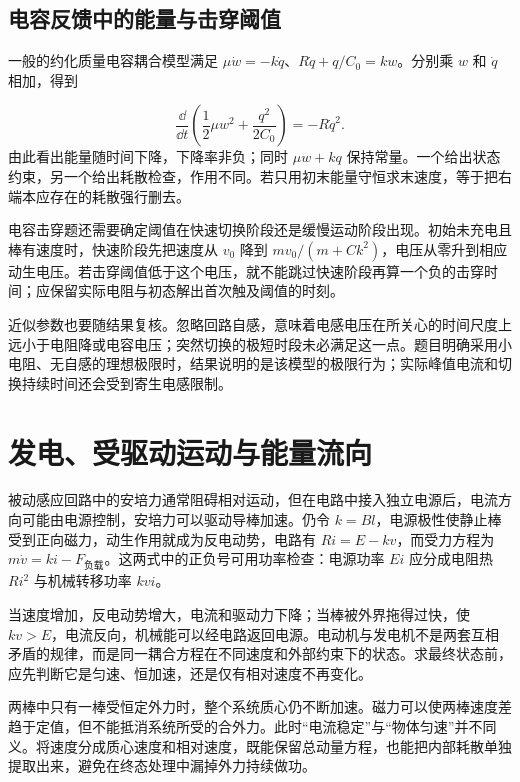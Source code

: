 \subsection{电容反馈中的能量与击穿阈值}

一般的约化质量电容耦合模型满足 $\mu\dot w=-k\dot q$、$R\dot q+q/C_0=kw$。分别乘 $w$ 和 $\dot q$ 相加，得到

\[\frac\dd{\dd t}\left(\frac12\mu w^2+\frac{q^2}{2C_0}\right)=-R\dot q^2.\]
由此看出能量随时间下降，下降率非负；同时 $\mu w+kq$ 保持常量。一个给出状态约束，另一个给出耗散检查，作用不同。若只用初末能量守恒求末速度，等于把右端本应存在的耗散强行删去。


电容击穿题还需要确定阈值在快速切换阶段还是缓慢运动阶段出现。初始未充电且棒有速度时，快速阶段先把速度从 $v_0$ 降到 $mv_0/(m+Ck^2)$，电压从零升到相应动生电压。若击穿阈值低于这个电压，就不能跳过快速阶段再算一个负的击穿时间；应保留实际电阻与初态解出首次触及阈值的时刻。


近似参数也要随结果复核。忽略回路自感，意味着电感电压在所关心的时间尺度上远小于电阻降或电容电压；突然切换的极短时段未必满足这一点。题目明确采用小电阻、无自感的理想极限时，结果说明的是该模型的极限行为；实际峰值电流和切换持续时间还会受到寄生电感限制。



\section{发电、受驱动运动与能量流向}

被动感应回路中的安培力通常阻碍相对运动，但在电路中接入独立电源后，电流方向可能由电源控制，安培力可以驱动导棒加速。仍令 $k=Bl$，电源极性使静止棒受到正向磁力，动生作用就成为反电动势，电路有 $Ri=E-kv$，而受力方程为 $m\dot v=ki-F_{\text{负载}}$。这两式中的正负号可用功率检查：电源功率 $Ei$ 应分成电阻热 $Ri^2$ 与机械转移功率 $kvi$。


当速度增加，反电动势增大，电流和驱动力下降；当棒被外界拖得过快，使 $kv>E$，电流反向，机械能可以经电路返回电源。电动机与发电机不是两套互相矛盾的规律，而是同一耦合方程在不同速度和外部约束下的状态。求最终状态前，应先判断它是匀速、恒加速，还是仅有相对速度不再变化。


两棒中只有一棒受恒定外力时，整个系统质心仍不断加速。磁力可以使两棒速度差趋于定值，但不能抵消系统所受的合外力。此时“电流稳定”与“物体匀速”并不同义。将速度分成质心速度和相对速度，既能保留总动量方程，也能把内部耗散单独提取出来，避免在终态处理中漏掉外力持续做功。





